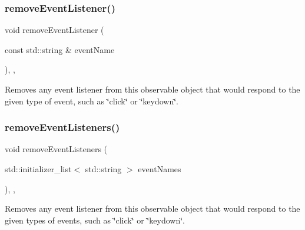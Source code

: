 \subsubsection{\texorpdfstring{remove\+Event\+Listener()}{removeEventListener()}}
{\footnotesize\ttfamily void remove\+Event\+Listener (\begin{DoxyParamCaption}\item[{const std\+::string \&}]{event\+Name }\end{DoxyParamCaption})\hspace{0.3cm}{\ttfamily [protected]}, {\ttfamily [virtual]}, {\ttfamily [inherited]}}



Removes any event listener from this observable object that would respond to the given type of event, such as \char`\"{}click\char`\"{} or \char`\"{}keydown\char`\"{}. 

\mbox{\label{classsgl_1_1GObservable_af51cc35c29a1bd1908609d432decdbb6}} 
\subsubsection{\texorpdfstring{remove\+Event\+Listeners()}{removeEventListeners()}}
{\footnotesize\ttfamily void remove\+Event\+Listeners (\begin{DoxyParamCaption}\item[{std\+::initializer\+\_\+list$<$ std\+::string $>$}]{event\+Names }\end{DoxyParamCaption})\hspace{0.3cm}{\ttfamily [protected]}, {\ttfamily [virtual]}, {\ttfamily [inherited]}}



Removes any event listener from this observable object that would respond to the given types of events, such as \char`\"{}click\char`\"{} or \char`\"{}keydown\char`\"{}. 

\mbox{\label{classsgl_1_1GContainer_a87a74b040025878283ba685e30d5104f}} 

